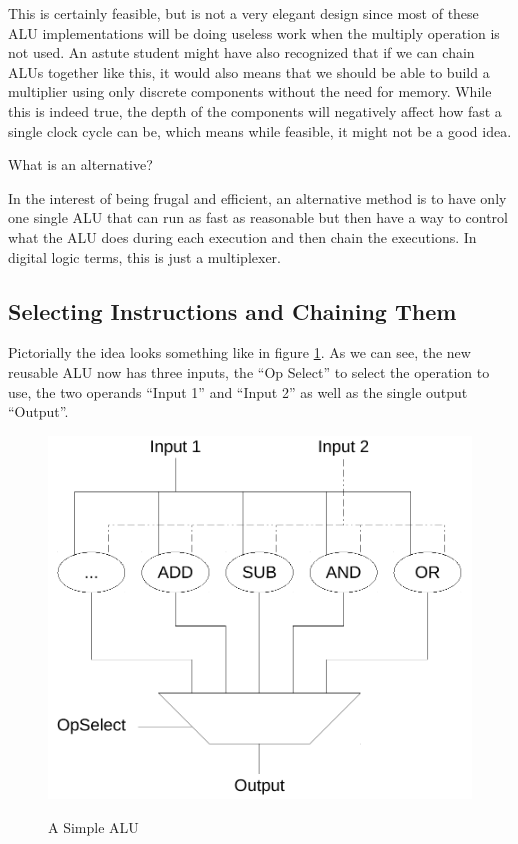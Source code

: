 This is certainly feasible, but is not a very elegant design since most of these ALU implementations will be doing useless work when the multiply operation is not used. An astute student might have also recognized that if we can chain ALUs together like this, it would also means that we should be able to build a multiplier using only discrete components without the need for memory. While this is indeed true, the depth of the components will negatively affect how fast a single clock cycle can be, which means while feasible, it might not be a good idea.

What is an alternative?

In the interest of being frugal and efficient, an alternative method is to have only one single ALU that can run as fast as reasonable but then have a way to control what the ALU does during each execution and then chain the executions. In digital logic terms, this is just a multiplexer. 

\subsection{Selecting Instructions and Chaining Them}

Pictorially the idea looks something like in figure \ref{fig:IntroToAssembly:SimpleALU}. As we can see, the new reusable ALU now has three inputs, the ``Op Select'' to select the operation to use, the two operands ``Input 1'' and ``Input 2'' as well as the single output ``Output''. 

\begin{figure}
\centering
\includegraphics[width=5in]{IntroToAssembly/images/SimpleALU}
\label{fig:IntroToAssembly:SimpleALU}
\caption{A Simple ALU}
\end{figure}



